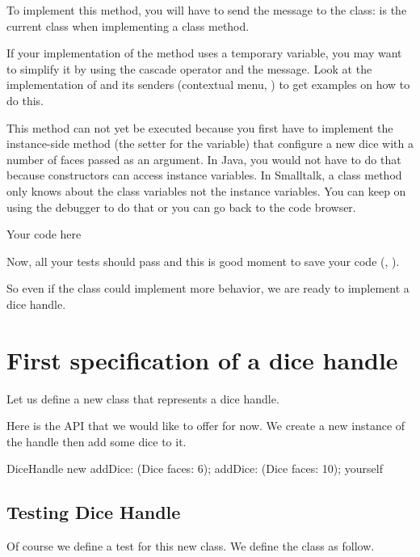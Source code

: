 \documentclass[a4paper,10pt,twoside]{book}
\begin{document}
To implement this method, you will have to send the message  to the class:  is the current class when implementing a class method.

\begin{note}

If your implementation of the method uses a temporary variable, you may want to simplify it by using the cascade operator \ct{;} and the  message. Look at the implementation of  and its senders (contextual menu, ) to get examples on how to do this.
\end{note}

This method can not yet be executed because you first have to implement the instance-side method  (the setter for the variable) that configure a new dice with a number of faces passed as an argument. In Java, you would not have to do that because constructors can access instance variables. In Smalltalk, a class method only knows about the class variables not the instance variables. You can keep on using the debugger to do that or you can go back to the code browser.


\begin{code}{}
Your code here
\end{code}


Now, all your tests should pass and this is good moment to save your code (, ).

So even if the class  could implement more behavior, we are ready to implement a dice handle.
\section{ First specification of a dice handle}
Let us define a new class  that represents a dice handle.

Here is the API that we would like to offer for now. We create a new instance of the handle then add some dice to it.


\begin{code}{}
DiceHandle new
    addDice: (Dice faces: 6);
    addDice: (Dice faces: 10);
    yourself
\end{code}

\subsection{ Testing Dice Handle}
Of course we define a test for this new class. We define the class  as follow.
\end{document}
